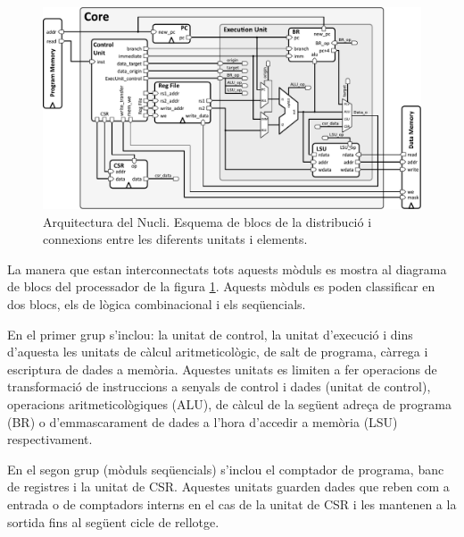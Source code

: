 \documentclass[10pt,a4paper,twocolumn,twoside]{article}
\begin{document}
    \label{sec:arch}
    \begin{figure}[!ht]
    \centering
    	\includegraphics[width=0.9\linewidth]{pdf/arch_RiscV.pdf}
        \caption{Arquitectura del Nucli. Esquema de blocs de la distribució i connexions entre les diferents unitats i elements.}
        \label{fig:core_arch}
    \end{figure}
    

    
    La manera que estan interconnectats tots aquests mòduls es mostra al diagrama de blocs del processador de la figura \ref{fig:core_arch}. Aquests mòduls es poden classificar en dos blocs, els de lògica combinacional i els seqüencials. 
    
    En el primer grup s'inclou: la unitat de control, la unitat d'execució i dins d'aquesta les unitats de càlcul aritmeticològic, de salt de programa, càrrega i escriptura de dades a memòria. Aquestes unitats es limiten a fer operacions de transformació de instruccions a senyals de control i dades (unitat de control), operacions aritmeticològiques (ALU), de càlcul de la següent adreça de programa (BR) o d'emmascarament de dades a l'hora d'accedir a memòria (LSU) respectivament.
    
    En el segon grup (mòduls seqüencials) s'inclou el comptador de programa, banc de registres i la unitat de CSR.
    Aquestes unitats guarden dades que reben com a entrada o de comptadors interns en el cas de la unitat de CSR i les mantenen a la sortida fins al següent cicle de rellotge. 
    
\end{document}
